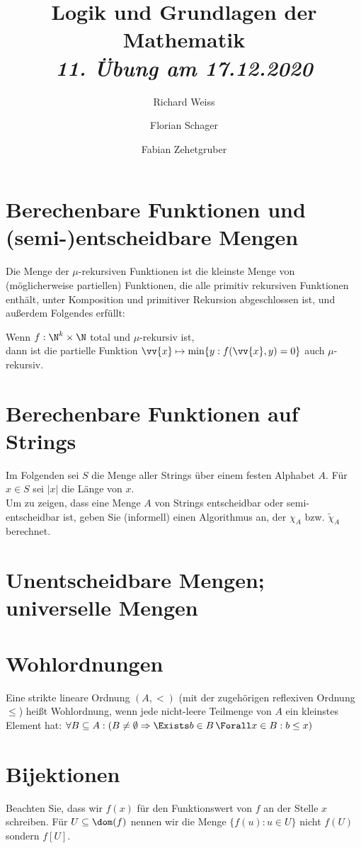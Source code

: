 \documentclass{article}
\title
{
  Logik und Grundlagen der Mathematik \\
  \vspace{4pt}
  \normalsize
  \textit{11. Übung am 17.12.2020}
}
\author
{
  Richard Weiss
  \and
  Florian Schager
  \and
  Fabian Zehetgruber
}
\date{}
\begin{document}
\maketitle

\section*{Berechenbare Funktionen und (semi-)entscheidbare Mengen}

Die Menge der $\mu$-rekursiven Funktionen ist die kleinste Menge von (möglicherweise partiellen)
Funktionen, die alle primitiv rekursiven Funktionen enthält, unter Komposition und
primitiver Rekursion abgeschlossen ist, und außerdem Folgendes erfüllt:

\begin{adjustwidth}{1cm}{}
Wenn $f: \N^k \times \N$ total und $\mu$-rekursiv ist, \\
dann ist die partielle Funktion $\vv{x} \mapsto \min\{y: f(\vv{x},y) = 0\}$ auch
$\mu$-rekursiv.
\end{adjustwidth}




\section*{Berechenbare Funktionen auf Strings}

Im Folgenden sei $S$ die Menge aller Strings über einem festen Alphabet $A$.
Für $x \in S$ sei $|x|$ die Länge von $x$. \\
Um zu zeigen, dass eine Menge $A$ von Strings entscheidbar oder semi-entscheidbar
ist, geben Sie (informell) einen Algorithmus an, der $\chi_A$ bzw. $\tilde{\chi}_A$
berechnet.



\section*{Unentscheidbare Mengen; universelle Mengen}



\section*{Wohlordnungen}

Eine strikte lineare Ordnung $(A, <)$ (mit der zugehörigen reflexiven Ordnung $\leq$)
heißt Wohlordnung, wenn jede nicht-leere Teilmenge von $A$ ein kleinstes Element hat:
$\forall B \subseteq A: (B \neq \emptyset \Rightarrow \Exists b \in B\, \Forall x \in B: b \leq x)$





\section*{Bijektionen}

Beachten Sie, dass wir $f(x)$ für den Funktionswert von $f$ an der Stelle $x$ schreiben.
Für $U \subseteq \dom(f)$ nennen wir die Menge $\{f(u): u \in U\}$ nicht $f(U)$
sondern $f[U]$.


\end{document}
